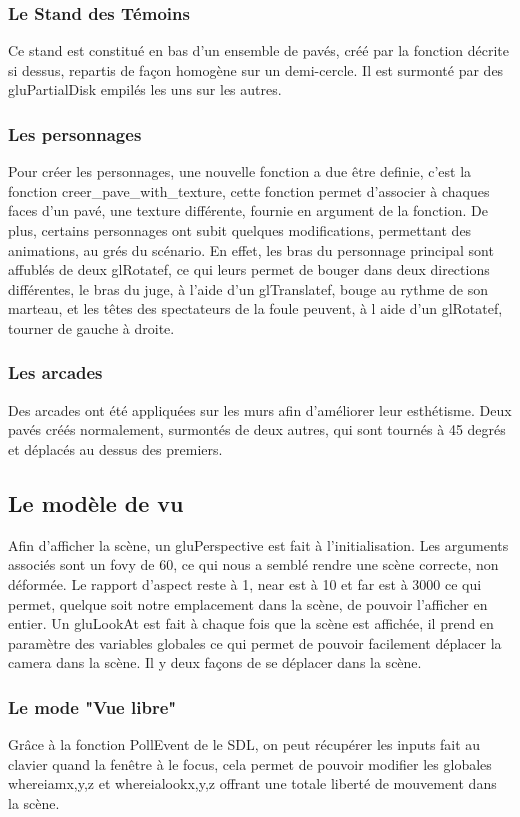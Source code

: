 	\subsubsection{Le Stand des Témoins}
	Ce stand est constitué en bas d'un ensemble de pavés, créé par la fonction décrite si dessus, repartis de façon homogène sur un demi-cercle. Il est surmonté par des gluPartialDisk empilés les uns sur les autres.
	\subsubsection{Les personnages}
	Pour créer les personnages, une nouvelle fonction a due être definie, c'est la fonction creer\_pave\_with\_texture, cette fonction permet d'associer à chaques faces d'un pavé, une texture différente, fournie en argument de la fonction. De plus, certains personnages ont subit quelques modifications, permettant des animations, au grés du scénario.
	En effet, les bras du personnage principal sont affublés de deux glRotatef, ce qui leurs permet de bouger dans deux directions différentes, le bras du juge, à l'aide d'un glTranslatef, bouge au rythme de son marteau, et les têtes des spectateurs de la foule peuvent, à l aide d'un glRotatef, tourner de gauche à droite.
	\subsubsection{Les arcades}
	Des arcades ont été appliquées sur les murs afin d'améliorer leur esthétisme. Deux pavés créés normalement, surmontés de deux autres, qui sont tournés à 45 degrés et déplacés au dessus des premiers.
\subsection{Le modèle de vu}
	Afin d'afficher la scène, un gluPerspective est fait à l'initialisation. Les arguments associés sont un fovy de 60, ce qui nous a semblé rendre une scène correcte, non déformée. Le rapport d'aspect reste à 1, near est à 10 et far est à 3000 ce qui permet, quelque soit notre emplacement dans la scène, de pouvoir l'afficher en entier.\newline
	Un gluLookAt est fait à chaque fois que la scène est affichée, il prend en paramètre des variables globales ce qui permet de pouvoir facilement déplacer la camera dans la scène. Il y deux façons de se déplacer dans la scène.
	\subsubsection{Le mode "Vue libre"}
	Grâce à la fonction PollEvent de le SDL, on peut récupérer les inputs fait au clavier quand la fenêtre à le focus, cela permet de pouvoir modifier les globales whereiam{x,y,z} et whereialook{x,y,z} offrant une totale liberté de mouvement dans la scène.
